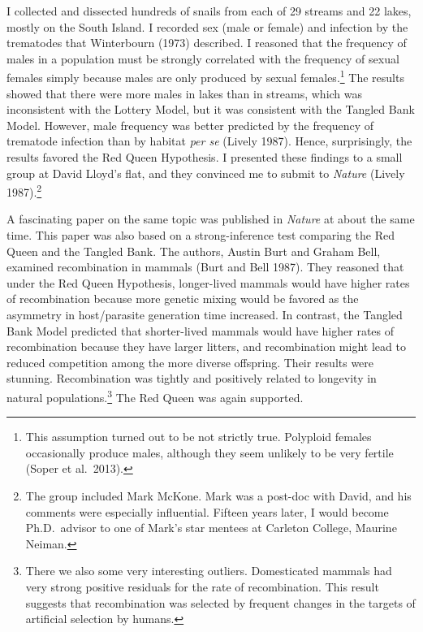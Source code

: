 \documentclass[
  letterpaper,
]{book}
\begin{document}
I collected and dissected hundreds of snails from each of 29 streams and
22 lakes, mostly on the South Island. I recorded sex (male or female)
and infection by the trematodes that Winterbourn (1973) described. I
reasoned that the frequency of males in a population must be strongly
correlated with the frequency of sexual females simply because males are
only produced by sexual females.\footnote{This assumption turned out to
  be not strictly true. Polyploid females occasionally produce males,
  although they seem unlikely to be very fertile (Soper et al.~2013).}
The results showed that there were more males in lakes than in streams,
which was inconsistent with the Lottery Model, but it was consistent
with the Tangled Bank Model. However, male frequency was better
predicted by the frequency of trematode infection than by habitat
\emph{per se} (Lively 1987). Hence, surprisingly, the results favored
the Red Queen Hypothesis. I presented these findings to a small group at
David Lloyd's flat, and they convinced me to submit to \emph{Nature}
(Lively 1987).\footnote{The group included Mark McKone. Mark was a
  post-doc with David, and his comments were especially influential.
  Fifteen years later, I would become Ph.D.~advisor to one of Mark's
  star mentees at Carleton College, Maurine Neiman.}

A fascinating paper on the same topic was published in \emph{Nature} at
about the same time. This paper was also based on a strong-inference
test comparing the Red Queen and the Tangled Bank. The authors, Austin
Burt and Graham Bell, examined recombination in mammals (Burt and Bell
1987). They reasoned that under the Red Queen Hypothesis, longer-lived
mammals would have higher rates of recombination because more genetic
mixing would be favored as the asymmetry in host/parasite generation
time increased. In contrast, the Tangled Bank Model predicted that
shorter-lived mammals would have higher rates of recombination because
they have larger litters, and recombination might lead to reduced
competition among the more diverse offspring. Their results were
stunning. Recombination was tightly and positively related to longevity
in natural populations.\footnote{There we also some very interesting
  outliers. Domesticated mammals had very strong positive residuals for
  the rate of recombination. This result suggests that recombination was
  selected by frequent changes in the targets of artificial selection by
  humans.} The Red Queen was again supported.
\end{document}
